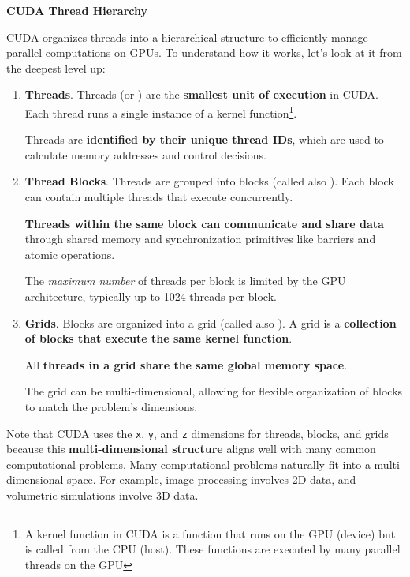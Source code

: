 \highspace
\begin{flushleft}
    \textcolor{Green3}{ \textbf{CUDA Thread Hierarchy}}
\end{flushleft}
CUDA organizes threads into a hierarchical structure to efficiently manage parallel computations on GPUs. To understand how it works, let's look at it from the deepest level up:
\begin{enumerate}
    \item \textbf{Threads}. Threads (or ) are the \textbf{smallest unit of execution} in CUDA. Each thread runs a single instance of a kernel function\footnote{A kernel function in CUDA is a function that runs on the GPU (device) but is called from the CPU (host). These functions are executed by many parallel threads on the GPU}.
    
    Threads are \textbf{identified by their unique thread IDs}, which are used to calculate memory addresses and control decisions.
    

    \item \textbf{Thread Blocks}. Threads are grouped into blocks (called also ). Each block can contain multiple threads that execute concurrently.
    
    \textbf{Threads within the same block can communicate and share data} through shared memory and synchronization primitives like barriers and atomic operations.
    
    The \emph{maximum number} of threads per block is limited by the GPU architecture, typically up to 1024 threads per block.
    
    
    \item \textbf{Grids}. Blocks are organized into a grid (called also ). A grid is a \textbf{collection of blocks that execute the same kernel function}.
    
    All \textbf{threads in a grid share the same global memory space}.
    
    The grid can be multi-dimensional, allowing for flexible organization of blocks to match the problem's dimensions.
\end{enumerate}
Note that CUDA uses the \texttt{x}, \texttt{y}, and \texttt{z} dimensions for threads, blocks, and grids because this \textbf{multi-dimensional structure} aligns well with many common computational problems. Many computational problems naturally fit into a multi-dimensional space. For example, image processing involves 2D data, and volumetric simulations involve 3D data.

